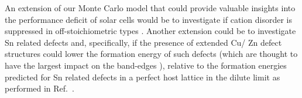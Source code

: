 \documentclass[11pt, twoside]{report}
\begin{document}
An extension of our Monte Carlo model that could provide valuable insights into the performance deficit of {\CZTS} solar cells would be to investigate if cation disorder is suppressed in off-stoichiometric {\CZTS} types \cite{CZTS_types, off-stoich_defects}. Another extension could be to investigate Sn related defects and, specifically, if the presence of extended Cu/ Zn defect structures could lower the formation energy of such defects (which are thought to have the largest impact on the band-edges \cite{kesterite_band_tails}), relative to the formation energies predicted for Sn related defects in a perfect host lattice in the dilute limit as performed in Ref.~.


\end{document}
